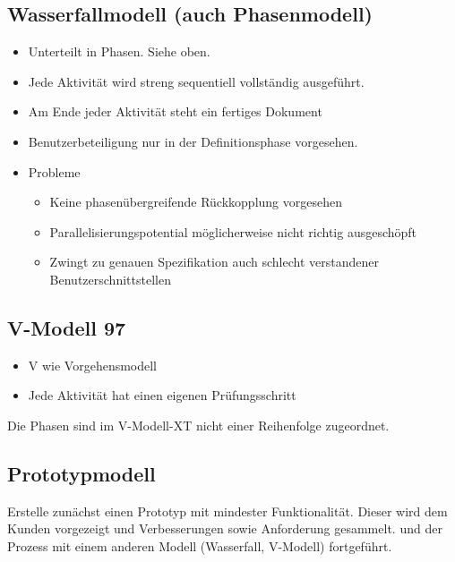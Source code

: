 \subsection{Wasserfallmodell (auch Phasenmodell)}
\begin{itemize}
    \item Unterteilt in Phasen. Siehe oben.
    \item Jede Aktivität wird streng sequentiell vollständig ausgeführt.
    \item Am Ende jeder Aktivität steht ein fertiges Dokument
    \item Benutzerbeteiligung nur in der Definitionsphase vorgesehen.
    \item Probleme
    \begin{itemize}
        \item Keine phasenübergreifende Rückkopplung vorgesehen
        \item Parallelisierungspotential möglicherweise nicht richtig ausgeschöpft
        \item Zwingt zu genauen Spezifikation auch schlecht verstandener Benutzerschnittstellen
    \end{itemize}
\end{itemize}

\newpage

\subsection{V-Modell 97}
\begin{itemize}
    \item V wie Vorgehensmodell
    \item Jede Aktivität hat einen eigenen Prüfungsschritt
\end{itemize}
Die Phasen sind im V-Modell-XT nicht einer Reihenfolge zugeordnet.




\subsection{Prototypmodell}
Erstelle zunächst einen Prototyp mit mindester Funktionalität. Dieser wird dem Kunden vorgezeigt und Verbesserungen sowie Anforderung gesammelt.
 und der Prozess mit einem anderen Modell (Wasserfall, V-Modell) fortgeführt.
\\


